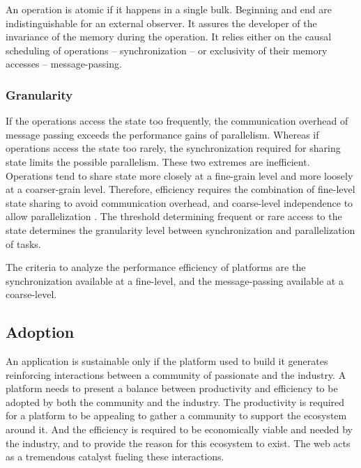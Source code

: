 An operation is atomic if it happens in a single bulk.
Beginning and end are indistinguishable for an external observer.
It assures the developer of the invariance of the memory during the operation.
It relies either on the causal scheduling of operations -- synchronization -- or exclusivity of their memory accesses -- message-passing.

\subsubsection{Granularity} \label{chapter3:definitions:efficiency:granularity}

If the operations access the state too frequently, the communication overhead of message passing exceeds the performance gains of parallelism.
Whereas if operations access the state too rarely, the synchronization required for sharing state limits the possible parallelism.
These two extremes are inefficient.
Operations tend to share state more closely at a fine-grain level and more loosely at a coarser-grain level.
Therefore, efficiency requires the combination of fine-level state sharing to avoid communication overhead, and coarse-level independence to allow parallelization \cite{Gustafson1988,Gunther1996,Nelson1996,Gunther2002}.
The threshold determining frequent or rare access to the state determines the granularity level between synchronization and parallelization of tasks.

\separator

The criteria to analyze the performance efficiency of platforms are the synchronization available at a fine-level, and the message-passing available at a coarse-level.


\subsection{Adoption} \label{chapter3:definitions:adoption}

An application is sustainable only if the platform used to build it generates reinforcing interactions between a community of passionate and the industry.
A platform needs to present a balance between productivity and efficiency to be adopted by both the community and the industry.
The productivity is required for a platform to be appealing to gather a community to support the ecosystem around it.
And the efficiency is required to be economically viable and needed by the industry, and to provide the reason for this ecosystem to exist.
The web acts as a tremendous catalyst fueling these interactions.

